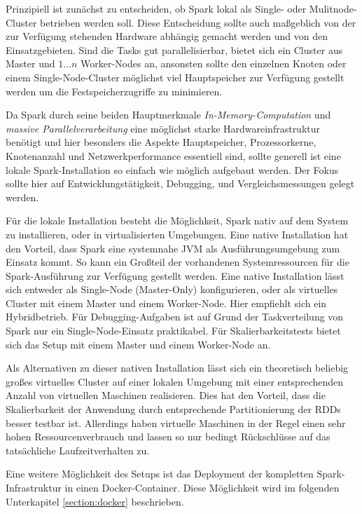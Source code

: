 Prinzipiell ist zunächst zu entscheiden, ob Spark lokal als Single- oder Mulitnode-Cluster betrieben werden soll. Diese Entscheidung sollte auch maßgeblich von der zur Verfügung stehenden Hardware abhängig gemacht werden und von den Einsatzgebieten. Sind die Tasks gut parallelisierbar, bietet sich ein Cluster aus Master und \(1...n\) Worker-Nodes an, ansonsten sollte den einzelnen Knoten oder einem Single-Node-Cluster möglichst viel Hauptspeicher zur Verfügung gestellt werden um die Festspeicherzugriffe zu minimieren. 

Da Spark durch seine beiden Hauptmerkmale \textit{In-Memory-Computation} und \textit{massive Parallelverarbeitung} eine möglichst starke Hardwareinfrastruktur benötigt und hier besonders die Aspekte Hauptspeicher, Prozessorkerne, Knotenanzahl und Netzwerkperformance essentiell sind, sollte generell ist eine lokale Spark-Installation so einfach wie möglich aufgebaut werden. Der Fokus sollte hier auf Entwicklungstätigkeit, Debugging, und Vergleichsmessungen gelegt werden. 

Für die lokale Installation besteht die Möglichkeit, Spark nativ auf dem System zu installieren, oder in virtualisierten Umgebungen. Eine native Installation hat den Vorteil, dass Spark eine systemnahe JVM als Ausführungsumgebung zum Einsatz kommt. So kann ein Großteil der vorhandenen Systemressourcen für die Spark-Ausführung zur Verfügung gestellt werden. Eine native Installation lässt sich entweder als Single-Node (Master-Only) konfigurieren, oder als virtuelles Cluster mit einem Master und einem Worker-Node. Hier empfiehlt sich ein Hybridbetrieb. Für Debugging-Aufgaben ist auf Grund der Taskverteilung von Spark nur ein Single-Node-Einsatz praktikabel. Für Skalierbarkeitstests bietet sich das Setup mit einem Master und einem Worker-Node an. 

Als Alternativen zu dieser nativen Installation lässt sich ein theoretisch beliebig großes virtuelles Cluster auf einer lokalen Umgebung mit einer entsprechenden Anzahl von virtuellen Maschinen realisieren. Dies hat den Vorteil, dass die Skalierbarkeit der Anwendung durch entsprechende Partitionierung der RDDs besser testbar ist. Allerdings haben virtuelle Maschinen in der Regel einen sehr hohen Ressourcenverbrauch und lassen so nur bedingt Rückschlüsse auf das tatsächliche Laufzeitverhalten zu. 

Eine weitere Möglichkeit des Setups ist das Deployment der kompletten Spark-Infrastruktur in einen Docker-Container. Diese Möglichkeit wird im folgenden Unterkapitel \ref{section:docker} beschrieben. 

